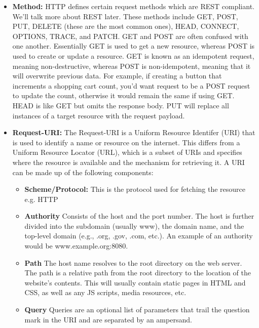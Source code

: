 \documentclass{article}
\begin{document}
\begin{itemize}

\item{%
   \textbf{Method:} HTTP defines certain request methods which are REST compliant. We'll talk more
   about REST later. These methods include GET, POST, PUT, DELETE (these are the most common ones), HEAD,
   CONNECT, OPTIONS, TRACE, and PATCH. GET and POST are often confused with one another. Essentially GET is
   used to get a new resource, whereas POST is used to create or update a resource. GET is known as an
   idempotent request, meaning non-destructive, whereas POST is non-idempotent, meaning that it will
   overwrite previous data. For example, if creating a button that increments a shopping cart count, you'd
   want request to be a POST request to update the count, otherwise it would remain the same if using GET.
   HEAD is like GET but omits the response body. PUT will replace all instances of a target resource with
   the request payload.
}

\item{%
   \textbf{Request-URI:} The Request-URI is a Uniform Resource Identifer (URI) that is used to
   identify a name or resource on the internet. This differs from a Uniform Resource Locator (URL), which is a
   subset of URIs and specifies where the resource is available and the mechanism for retrieving it. A URI can
   be made up of the following components:

   \begin{itemize}

   \item{%
      \textbf{Scheme/Protocol:} This is the protocol used for fetching the resource e.g. HTTP
   }

   \item{%
      \textbf{Authority} Consists of the host and the port number. The host is further divided
      into the subdomain (usually www), the domain name, and the top-level domain
      (e.g., .org, .gov, .com, etc.). An example of an authority would be www.example.org:8080.
   }

   \item{%
      \textbf{Path} The host name resolves to the root directory on the web server. The path is a
      relative path from the root directory to the location of the website's contents. This will usually
      contain static pages in HTML and CSS, as well as any JS scripts, media resources, etc.
   }

   \item{%
      \textbf{Query} Queries are an optional list of parameters that trail the question mark in
      the URI and are separated by an ampersand.
   }


\end{itemize}}
\end{itemize}
\end{document}
